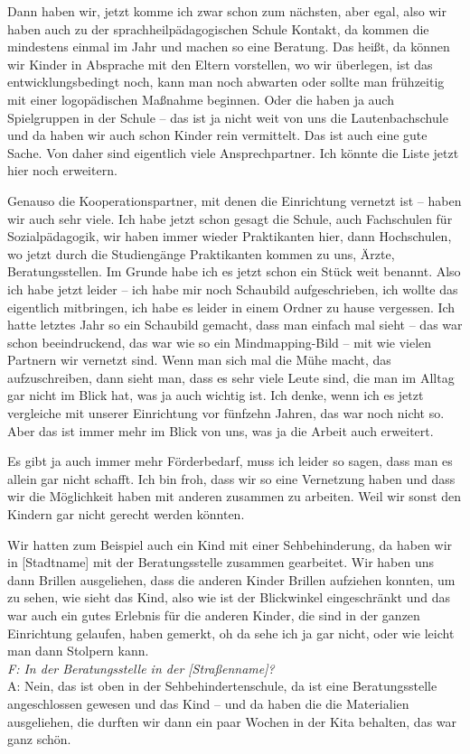 \begin{linenumbers*}
Dann haben wir, jetzt komme ich zwar schon zum nächsten, aber egal, also wir haben auch zu der sprachheilpädagogischen Schule Kontakt, da kommen die mindestens einmal im Jahr und machen so eine Beratung. Das heißt, da können wir Kinder in Absprache mit den Eltern vorstellen, wo wir überlegen, ist das entwicklungsbedingt noch, kann man noch abwarten oder sollte man frühzeitig mit einer logopädischen Maßnahme beginnen. Oder die haben ja auch Spielgruppen in der Schule -- das ist ja nicht weit von uns die Lautenbachschule und da haben wir auch schon Kinder rein vermittelt. Das ist auch eine gute Sache. Von daher sind eigentlich viele Ansprechpartner. Ich könnte die Liste jetzt hier noch erweitern. 

Genauso die Kooperationspartner, mit denen die Einrichtung vernetzt ist -- haben wir auch sehr viele. Ich habe jetzt schon gesagt die Schule, auch Fachschulen für Sozialpädagogik, wir haben immer wieder Praktikanten hier, dann Hochschulen, wo jetzt durch die Studiengänge Praktikanten kommen zu uns, Ärzte, Beratungsstellen. Im Grunde habe ich es jetzt schon ein Stück weit benannt.
Also ich habe jetzt leider -- ich habe mir noch Schaubild aufgeschrieben, ich wollte das eigentlich mitbringen, ich habe es leider in einem Ordner zu hause vergessen. Ich hatte letztes Jahr so ein Schaubild gemacht, dass man einfach mal sieht -- das war schon beeindruckend, das war wie so ein Mindmapping-Bild -- mit wie vielen Partnern wir vernetzt sind. Wenn man sich mal die Mühe macht, das aufzuschreiben, dann sieht man, dass es sehr viele Leute sind, die man im Alltag gar nicht im Blick hat, was ja auch wichtig ist. Ich denke, wenn ich es jetzt vergleiche mit unserer Einrichtung vor fünfzehn Jahren, das war noch nicht so. Aber das ist immer mehr im Blick von uns, was ja die Arbeit auch erweitert. 

Es gibt ja auch immer mehr Förderbedarf, muss ich leider so sagen, dass man es allein gar nicht schafft. Ich bin froh, dass wir so eine Vernetzung haben und dass wir die Möglichkeit haben mit anderen zusammen zu arbeiten. Weil wir sonst den Kindern gar nicht gerecht werden könnten.  

Wir hatten zum Beispiel auch ein Kind mit einer Sehbehinderung, da haben wir in {[Stadtname]} mit der Beratungsstelle zusammen gearbeitet. Wir haben uns dann Brillen ausgeliehen, dass die anderen Kinder Brillen aufziehen konnten, um zu sehen, wie sieht das Kind, also wie ist der Blickwinkel eingeschränkt und das war auch ein gutes Erlebnis für die anderen Kinder, die sind in der ganzen Einrichtung gelaufen, haben gemerkt, oh da sehe ich ja gar nicht, oder wie leicht man dann Stolpern kann.\\ 
\emph{F: In der Beratungsstelle in der {[Straßenname]}?}\\
A: Nein, das ist oben in der Sehbehindertenschule, da ist eine Beratungsstelle angeschlossen gewesen und das Kind -- und da haben die die Materialien ausgeliehen, die durften wir dann ein paar Wochen in der Kita behalten, das war ganz schön.  


\end{linenumbers*}
